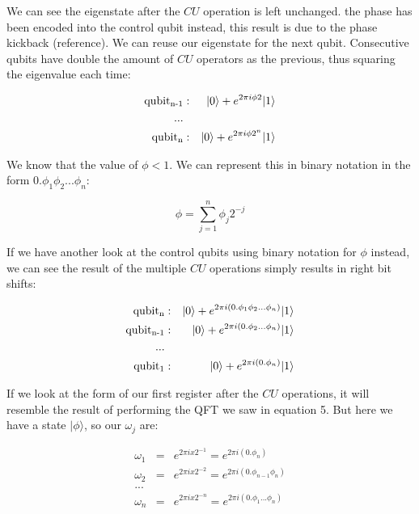 \documentclass[twocolumn,showpacs,preprintnumbers,amsmath,amssymb]{revtex4}
\begin{document}
		We can see the eigenstate after the $CU$ operation is left unchanged. the phase has been encoded into the control qubit instead, this result is due to the phase kickback (reference). We can reuse our eigenstate for the next qubit. Consecutive qubits have double the amount of $CU$ operators as the previous, thus squaring the eigenvalue each time:
		
		\begin{eqnarray*}
		\text{qubit\textsubscript{n-1}} &:&   |0 \rangle + e^{2\pi i \phi 2}|1 \rangle \\
		...\\
		\text{qubit\textsubscript{n}} &:&   |0 \rangle + e^{2\pi i \phi 2^n}|1 \rangle
	    \end{eqnarray*}
		
		We know that the value of $\phi < 1$. We can represent this in binary notation  in the form $0.\phi_1\phi_2...\phi_n$:
		
		$$\phi = \sum_{j=1}^n \phi_j 2^{-j}$$
		
		If we have another look at the control qubits using binary notation for $\phi$ instead, we can see the result of the multiple $CU$ operations simply results in right bit shifts:
		
		
		\begin{eqnarray*}
			\text{qubit\textsubscript{n}} &:&   |0 \rangle +e^{2\pi i (0.\phi_1\phi_2...\phi_n)}|1 \rangle  \\
			\text{qubit\textsubscript{n-1}} &:&   |0 \rangle + e^{2\pi i (0.\phi_2...\phi_n)}|1 \rangle \\
			...\\
			\text{qubit\textsubscript{1}} &:&   |0 \rangle + e^{2\pi i (0.\phi_n)}|1 \rangle
		\end{eqnarray*}
	
		If we look at the form of our first register after the $CU$ operations, it will resemble the result of performing the QFT we saw in equation 5. But here we have a state $|\phi\rangle$, so our $\omega_j$ are:
		
		\begin{eqnarray*}
			\omega_1 &=& e^{2\pi i x 2^{-1}} =  e^{2\pi i (0.\phi_n)}\\
			\omega_2 &=& e^{2\pi i x 2^{-2}} =  e^{2\pi i (0.\phi_{n-1}\phi_n)}\\
			...\\
			\omega_n &=& e^{2\pi i x 2^{-n}} =  e^{2\pi i (0.\phi_1...\phi_n)}
		\end{eqnarray*}
		
\end{document}
